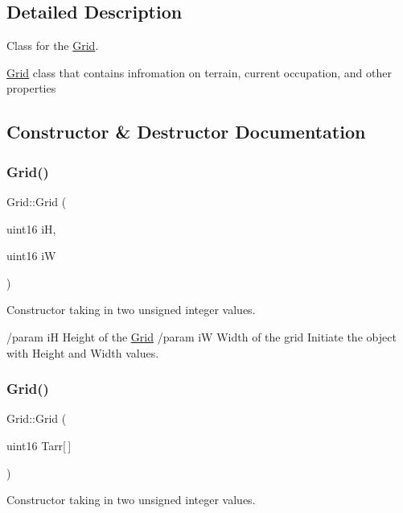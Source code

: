 \subsection{Detailed Description}
Class for the \hyperlink{class_grid}{Grid}. 

\hyperlink{class_grid}{Grid} class that contains infromation on terrain, current occupation, and other properties 

\subsection{Constructor \& Destructor Documentation}
\hypertarget{class_grid_a3602235a1d7b17254b0219dc7b754456}{}\label{class_grid_a3602235a1d7b17254b0219dc7b754456} 
\subsubsection{\texorpdfstring{Grid()}{Grid()}\hspace{0.1cm}{\footnotesize\ttfamily [1/2]}}
{\footnotesize\ttfamily Grid\+::\+Grid (\begin{DoxyParamCaption}\item[{uint16}]{iH,  }\item[{uint16}]{iW }\end{DoxyParamCaption})}



Constructor taking in two unsigned integer values. 

/param iH Height of the \hyperlink{class_grid}{Grid} /param iW Width of the grid Initiate the object with Height and Width values. \hypertarget{class_grid_a5c60d994d3dcfab965bf7b62d028a797}{}\label{class_grid_a5c60d994d3dcfab965bf7b62d028a797} 
\subsubsection{\texorpdfstring{Grid()}{Grid()}\hspace{0.1cm}{\footnotesize\ttfamily [2/2]}}
{\footnotesize\ttfamily Grid\+::\+Grid (\begin{DoxyParamCaption}\item[{uint16}]{Tarr\mbox{[}$\,$\mbox{]} }\end{DoxyParamCaption})}



Constructor taking in two unsigned integer values. 

